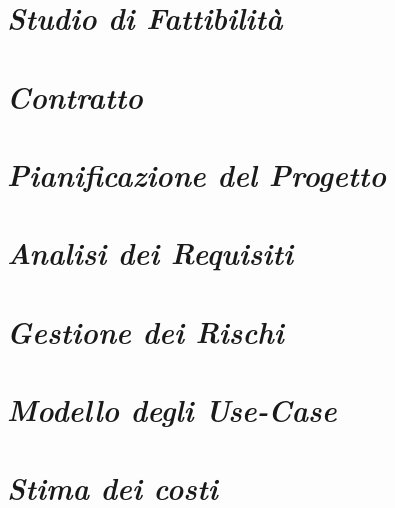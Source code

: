 \documentclass{article}
\begin{document}
\newpage
\section{\itshape{Studio di Fattibilità}}


\newpage
\section{\itshape{Contratto}}


\newpage
\section{\itshape{Pianificazione del Progetto}}


\newpage
\section{\itshape{Analisi dei Requisiti}}


\newpage
\section{\itshape{Gestione dei Rischi}}


\newpage
\section{\itshape{Modello degli Use-Case}}


\newpage
\section{\itshape{Stima dei costi}}

\end{document}
